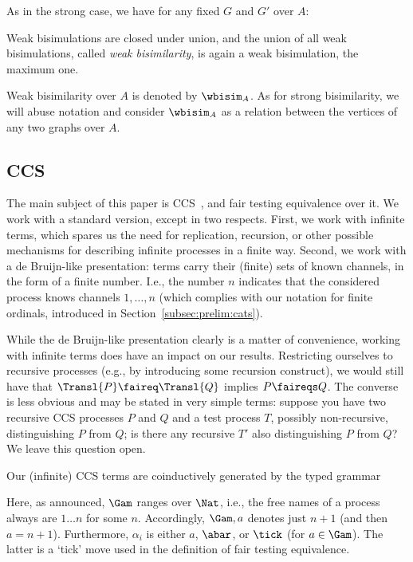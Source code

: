 \documentclass{LMCS}
\theoremstyle{plain}\newtheorem{satz}[thm]{Satz}
\begin{document}
As in the strong case, we have for any fixed $G$ and $G'$ over $A$:
\begin{prop}
  Weak bisimulations are closed under union, and the union of all weak
  bisimulations, called \emph{weak bisimilarity}, is again a weak
  bisimulation, the maximum one.
\end{prop}
\begin{notation}
  Weak bisimilarity over $A$ is denoted by $\wbisim_A$. As for strong
  bisimilarity, we will abuse notation and consider $\wbisim_A$ as a
  relation between the vertices of any two graphs over $A$.
\end{notation}


\subsection{CCS}
The main subject of this paper is CCS~\cite{Milner89}, and fair
testing equivalence over it.  We work with a standard version, except
in two respects. First, we work with infinite terms, which spares us
the need for replication, recursion, or other possible mechanisms for
describing infinite processes in a finite way.  Second, we work with a
de Bruijn-like presentation: terms carry their (finite) sets of known
channels, in the form of a finite number. I.e., the number $n$
indicates that the considered process knows channels $1, \ldots, n$
(which complies with our notation for finite ordinals, introduced in
Section~\ref{subsec:prelim:cats}).

\begin{rem}
  While the de Bruijn-like presentation clearly is a matter of
  convenience, working with infinite terms does have an impact on our
  results.  Restricting ourselves to recursive processes (e.g., by
  introducing some recursion construct), we would still have that
  $\Transl{P} \faireq \Transl{Q}$ implies $P \faireqs Q$.  The
  converse is less obvious and may be stated in very simple terms:
  suppose you have two recursive CCS processes $P$ and $Q$ and a test
  process $T$, possibly non-recursive, distinguishing $P$ from $Q$; is
  there any recursive $T'$ also distinguishing $P$ from $Q$?  We leave
  this question open.
\end{rem}



Our (infinite) CCS terms are coinductively generated by the typed grammar
Here, as announced, $\Gam$ ranges over $\Nat$, i.e., the free names of
a process always are $1 \ldots n$ for some $n$. Accordingly, $\Gam,a$
denotes just $n+1$ (and then $a = n+1$).  Furthermore, $\alpha_i$ is
either $a$, $\abar$, or $\tick$ (for $a \in \Gam$).  The latter is a
`tick' move used in the definition of fair testing equivalence.
\end{document}
